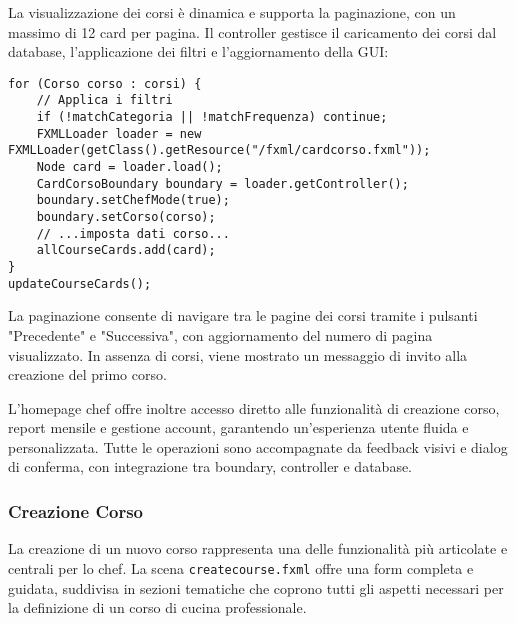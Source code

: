 La visualizzazione dei corsi è dinamica e supporta la paginazione, con un massimo di 12 card per pagina. Il controller gestisce il caricamento dei corsi dal database, l'applicazione dei filtri e l'aggiornamento della GUI:
\begin{verbatim}
for (Corso corso : corsi) {
    // Applica i filtri
    if (!matchCategoria || !matchFrequenza) continue;
    FXMLLoader loader = new FXMLLoader(getClass().getResource("/fxml/cardcorso.fxml"));
    Node card = loader.load();
    CardCorsoBoundary boundary = loader.getController();
    boundary.setChefMode(true);
    boundary.setCorso(corso);
    // ...imposta dati corso...
    allCourseCards.add(card);
}
updateCourseCards();
\end{verbatim}

La paginazione consente di navigare tra le pagine dei corsi tramite i pulsanti "Precedente" e "Successiva", con aggiornamento del numero di pagina visualizzato. In assenza di corsi, viene mostrato un messaggio di invito alla creazione del primo corso.

L'homepage chef offre inoltre accesso diretto alle funzionalità di creazione corso, report mensile e gestione account, garantendo un'esperienza utente fluida e personalizzata. Tutte le operazioni sono accompagnate da feedback visivi e dialog di conferma, con integrazione tra boundary, controller e database.

\subsubsection{Creazione Corso}

La creazione di un nuovo corso rappresenta una delle funzionalità più articolate e centrali per lo chef. La scena \texttt{createcourse.fxml} offre una form completa e guidata, suddivisa in sezioni tematiche che coprono tutti gli aspetti necessari per la definizione di un corso di cucina professionale.

